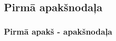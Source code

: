 \hspace*{5mm} %
\lipsum[2-4]
\subsection{Pirmā apakšnodaļa}
\hspace*{5mm}%
\lipsum[5-5]
\subsubsection{Pirmā apakš - apakšnodaļa}
\hspace*{5mm}%
\lipsum[6-6]